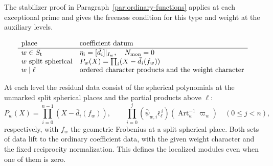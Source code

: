 The stabilizer proof in Paragraph~\ref{par:ordinary-functions}
applies at each exceptional prime and gives the freeness condition
for this type and weight at the auxiliary levels.

\begin{construction}
\[
\begin{array}{ll}
\text{place}&\text{coefficient datum}\\ \hline
w\in S_{\rm t}&\eta_i=[\bar d_i]|_{I_w},\quad N_{\rm mon}=0\\
w\text{ split spherical}&P_w(X)=\prod_i(X-\bar d_i(f_w))\\
w\mid\ell&\text{ordered character products and the weight character}
\end{array}
\]
\caption{The residue labels enter the ordinary level in different ways at the three kinds of place. The spherical normalization uses geometric Frobenius.}\label{fig:ordinary-coefficient-places}
\end{construction}

\begin{lemma}
\label{lem:ordinary-residual-data}
At each level the residual data consist of the spherical polynomials at the unmarked split spherical places and the partial products above \(\ell\):
\[
 P_w(X)=\prod_{i=0}^{n-1}(X-\bar d_i(f_w)),\qquad
 \prod_{i=0}^{j}(\bar\psi_{w,i}\bar\epsilon_\ell^{\,i})
                 (\operatorname{Art}_w^{-1}\varpi_w)\quad(0\le j<n),
\]
respectively, with \(f_w\) the geometric Frobenius at a split spherical place. Both sets of data lift to the ordinary coefficient data, with the given weight character
and the fixed reciprocity normalization. This defines the localized
modules even when one of them is zero.
\end{lemma}

